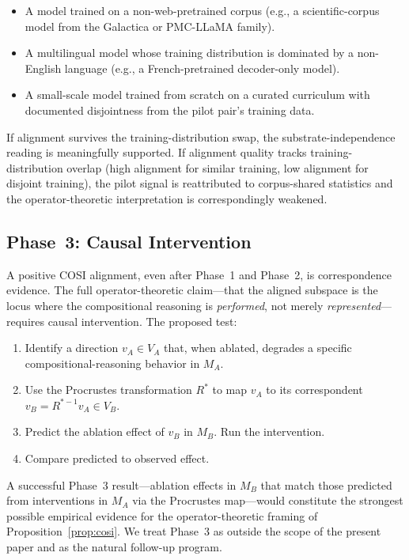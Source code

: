 \begin{itemize}
    \item A model trained on a non-web-pretrained corpus (e.g., a
        scientific-corpus model from the Galactica
        \cite{taylor2022galactica} or PMC-LLaMA family).
    \item A multilingual model whose training distribution is dominated
        by a non-English language (e.g., a French-pretrained
        decoder-only model).
    \item A small-scale model trained from scratch on a curated
        curriculum with documented disjointness from the pilot pair's
        training data.
\end{itemize}

If alignment survives the training-distribution swap, the
substrate-independence reading is meaningfully supported. If alignment
quality tracks training-distribution overlap (high alignment for
similar training, low alignment for disjoint training), the pilot
signal is reattributed to corpus-shared statistics and the
operator-theoretic interpretation is correspondingly weakened.

\subsection{Phase~3: Causal Intervention}

A positive COSI alignment, even after Phase~1 and Phase~2, is
correspondence evidence. The full operator-theoretic claim---that the
aligned subspace is the locus where the compositional reasoning is
\emph{performed}, not merely \emph{represented}---requires causal
intervention. The proposed test:

\begin{enumerate}
    \item Identify a direction $v_A \in V_A$ that, when ablated, degrades
        a specific compositional-reasoning behavior in $M_A$.
    \item Use the Procrustes transformation $R^*$ to map $v_A$ to its
        correspondent $v_B = R^{*-1} v_A \in V_B$.
    \item Predict the ablation effect of $v_B$ in $M_B$. Run the
        intervention.
    \item Compare predicted to observed effect.
\end{enumerate}

A successful Phase~3 result---ablation effects in $M_B$ that match those
predicted from interventions in $M_A$ via the Procrustes map---would
constitute the strongest possible empirical evidence for the
operator-theoretic framing of Proposition~\ref{prop:cosi}. We treat
Phase~3 as outside the scope of the present paper and as the natural
follow-up program.

